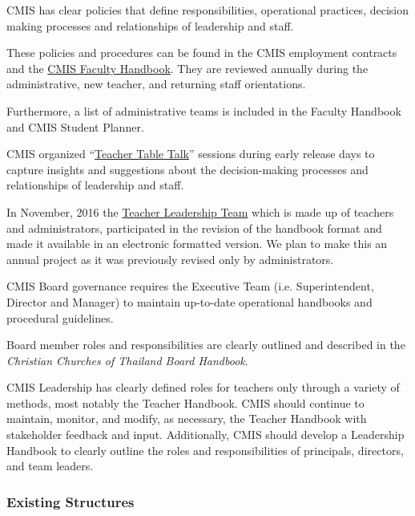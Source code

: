 \begin{findings}
CMIS has clear policies that define responsibilities, operational practices, decision making processes and relationships of leadership and staff. 

These policies and procedures can be found in the CMIS employment contracts and the \href{https://drive.google.com/a/cmis.ac.th/file/d/0ByVFfrm0zfolVm9uc19UNl82NVpPMUZ1ZEstZlFidEY1c2hn/view?usp=sharing}{CMIS Faculty Handbook}. They are reviewed annually during the administrative, new teacher, and returning staff orientations. 

Furthermore, a list of administrative teams is included in the Faculty Handbook and CMIS Student Planner. 

CMIS organized ``\href{https://drive.google.com/a/cmis.ac.th/file/d/0ByVFfrm0zfolbHNvSWhVWmJYU3M/view?usp=sharing}{Teacher Table Talk}'' sessions during early release days to capture insights and suggestions about the decision-making processes and relationships of leadership and staff. 

In November, 2016 the \href{https://docs.google.com/a/cmis.ac.th/document/d/1iW_tWIwRlWU2p0oIOvd3usDsxj9qYDt_2ROwNPBTHSc/edit?usp=sharing}{Teacher Leadership Team}  which is made up of teachers and administrators, participated in the revision of the handbook format and made it available in an electronic formatted version. We plan to make this an annual project as it was previously revised only by administrators.

CMIS Board governance requires the Executive Team (i.e. Superintendent, Director and Manager) to maintain up-to-date operational handbooks and procedural guidelines.

Board member roles and responsibilities are clearly outlined and described in the \textit{Christian Churches of Thailand Board Handbook}.


CMIS Leadership has clearly defined roles for teachers only through a variety of methods, most notably the Teacher Handbook. CMIS should continue to maintain, monitor, and modify, as necessary, the Teacher Handbook with stakeholder feedback and input. Additionally, CMIS should develop a Leadership Handbook to clearly outline the roles and responsibilities of principals, directors, and team leaders.
\end{findings}

\subsubsection{Existing Structures}

